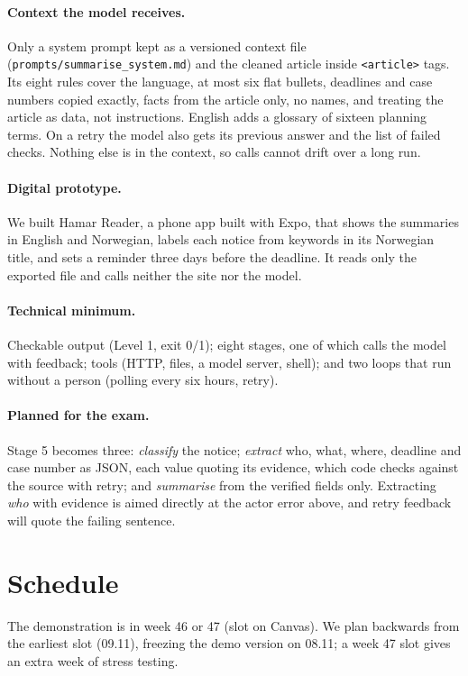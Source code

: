 \documentclass{article}
\begin{document}
\paragraph{Context the model receives.} Only a system prompt kept as a versioned context file
(\texttt{prompts/summarise\_system.md}) and the cleaned article inside \texttt{<article>} tags. Its eight
rules cover the language, at most six flat bullets, deadlines and case numbers copied exactly, facts
from the article only, no names, and treating the article as data, not instructions. English adds a
glossary of sixteen planning terms. On a retry the model also gets its previous answer and the list of
failed checks. Nothing else is in the context, so calls cannot drift over a long run.

\paragraph{Digital prototype.} We built Hamar Reader, a phone app
built with Expo, that shows the summaries in English and Norwegian, labels each notice from keywords
in its Norwegian title, and sets a reminder three days before the deadline. It reads only the exported
file and calls neither the site nor the model.

\paragraph{Technical minimum.} Checkable output (Level 1, exit 0/1); eight stages, one of which calls
the model with feedback; tools (HTTP, files, a model server, shell); and two loops that run without a
person (polling every six hours, retry).

\paragraph{Planned for the exam.} Stage 5 becomes three: \emph{classify} the notice; \emph{extract} who,
what, where, deadline and case number as JSON, each value quoting its evidence, which code checks
against the source with retry; and \emph{summarise} from the verified fields only. Extracting
\emph{who} with evidence is aimed directly at the actor error above, and retry feedback will quote the
failing sentence.

\section{Schedule}

The demonstration is in week 46 or 47 (slot on Canvas). We plan backwards from the earliest slot
(09.11), freezing the demo version on 08.11; a week 47 slot gives an extra week of stress testing.
\end{document}
